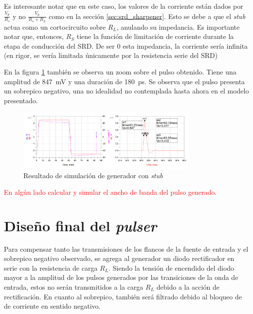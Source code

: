 Es interesante notar que en este caso, los valores de la corriente están dados
por $\frac{V_p}{R_s}$ y no $\frac{V_p}{R_s+R_L}$ como en la sección
\ref{sec:srd_sharpener}. Esto se debe a que el \textit{stub} actua como un
cortocircuito sobre $R_L$, anulando su impedancia. Es importante notar que,
entonces, $R_S$ tiene la función de limitación de corriente durante la etapa
de conducción del SRD. De ser $0$ esta impedancia, la corriente sería infinita
(en rigor, se vería limitada únicamente por la resistencia serie del SRD)

En la figura \ref{fig:stub_generator_sim_result} también se observa un zoom sobre el
pulso obtenido. Tiene una amplitud de \qty{847}{\milli\volt} y una duración de
\qty{180}{\pico\second}. Se observa que el pulso presenta un sobrepico negativo,
una no idealidad no contemplada hasta ahora en el modelo presentado.

\begin{figure}[tbp]
    \centering
    \includegraphics[width=0.8\textwidth]{images/stub_generator_sim_result.png}
    \caption{Resultado de simulación de generador con \textit{stub}}
    \label{fig:stub_generator_sim_result}
\end{figure}

\textcolor{red}{En algún lado calcular y simular el ancho de banda del pulso
generado}.

\section{Diseño final del \textit{pulser}}

Para compensar tanto las transmisiones de los flancos de la fuente de entrada y
el sobrepico negativo observado, se agrega al generador un diodo rectificador en
serie con la resistencia de carga $R_L$. Siendo la tensión de encendido del
diodo mayor a la amplitud de los pulsos generados por las transiciones de la
onda de entrada, estos no serán transmitidos a la carga $R_L$ debido a la acción
de rectificación. En cuanto al sobrepico, también será filtrado debido al
bloqueo de de corriente en sentido negativo.

